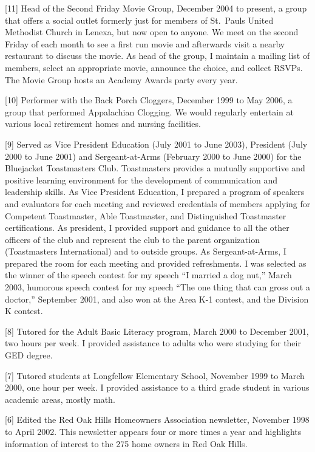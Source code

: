 \documentclass[
  12pt,
]{article}
\begin{document}
{[}11{]} Head of the Second Friday Movie Group, December 2004 to
present, a group that offers a social outlet formerly just for members
of St.~Pauls United Methodist Church in Lenexa, but now open to anyone.
We meet on the second Friday of each month to see a first run movie and
afterwards visit a nearby restaurant to discuss the movie. As head of
the group, I maintain a mailing list of members, select an appropriate
movie, announce the choice, and collect RSVPs. The Movie Group hosts an
Academy Awards party every year.

{[}10{]} Performer with the Back Porch Cloggers, December 1999 to May
2006, a group that performed Appalachian Clogging. We would regularly
entertain at various local retirement homes and nursing facilities.

{[}9{]} Served as Vice President Education (July 2001 to June 2003),
President (July 2000 to June 2001) and Sergeant-at-Arms (February 2000
to June 2000) for the Bluejacket Toastmasters Club. Toastmasters
provides a mutually supportive and positive learning environment for the
development of communication and leadership skills. As Vice President
Education, I prepared a program of speakers and evaluators for each
meeting and reviewed credentials of members applying for Competent
Toastmaster, Able Toastmaster, and Distinguished Toastmaster
certifications. As president, I provided support and guidance to all the
other officers of the club and represent the club to the parent
organization (Toastmasters International) and to outside groups. As
Sergeant-at-Arms, I prepared the room for each meeting and provided
refreshments. I was selected as the winner of the speech contest for my
speech ``I married a dog nut,'' March 2003, humorous speech contest for
my speech ``The one thing that can gross out a doctor,'' September 2001,
and also won at the Area K-1 contest, and the Division K contest.

{[}8{]} Tutored for the Adult Basic Literacy program, March 2000 to
December 2001, two hours per week. I provided assistance to adults who
were studying for their GED degree.

{[}7{]} Tutored students at Longfellow Elementary School, November 1999
to March 2000, one hour per week. I provided assistance to a third grade
student in various academic areas, mostly math.

{[}6{]} Edited the Red Oak Hills Homeowners Association newsletter,
November 1998 to April 2002. This newsletter appears four or more times
a year and highlights information of interest to the 275 home owners in
Red Oak Hills.
\end{document}
